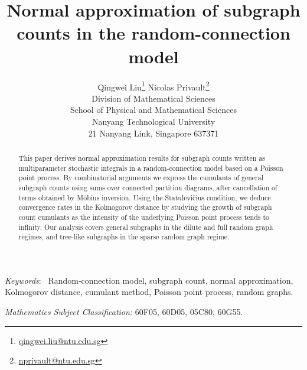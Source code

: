 \documentclass[12pt]{article}
\numberwithin{equation}{section}
\begin{document}
\title{
\huge
Normal approximation of subgraph counts in the random-connection model
} 

\author{
  Qingwei Liu\footnote{\href{mailto:qingwei.liu@ntu.edu.sg}{qingwei.liu@ntu.edu.sg}}
  \qquad
      Nicolas Privault\footnote{
\href{mailto:nprivault@ntu.edu.sg}{nprivault@ntu.edu.sg}
}
  \\
\small
Division of Mathematical Sciences
\\
\small
School of Physical and Mathematical Sciences
\\
\small
Nanyang Technological University
\\
\small
21 Nanyang Link, Singapore 637371
}

\maketitle

\vspace{-0.5cm}

\begin{abstract} 
  This paper derives normal approximation results for subgraph counts written as multiparameter stochastic integrals in a random-connection model based on a Poisson point process. By combinatorial arguments we express the cumulants of general subgraph counts using sums over connected partition diagrams, after cancellation of terms obtained by M\"obius inversion. Using the Statulevi\v{c}ius condition, we deduce convergence rates in the Kolmogorov distance by studying the growth of subgraph count cumulants as the intensity of the underlying Poisson point process tends to infinity. Our analysis covers general subgraphs in the dilute and full random graph regimes, and tree-like subgraphs in the sparse random graph regime.
\end{abstract}
\noindent\emph{Keywords}:~ 
Random-connection model, 
subgraph count,
normal approximation,
Kolmogorov distance,
cumulant method,
Poisson point process,
random graphs.

\noindent 
{\em Mathematics Subject Classification:} 
60F05, %
60D05, %
05C80, %
60G55. %
 
\baselineskip0.7cm
\end{document}
